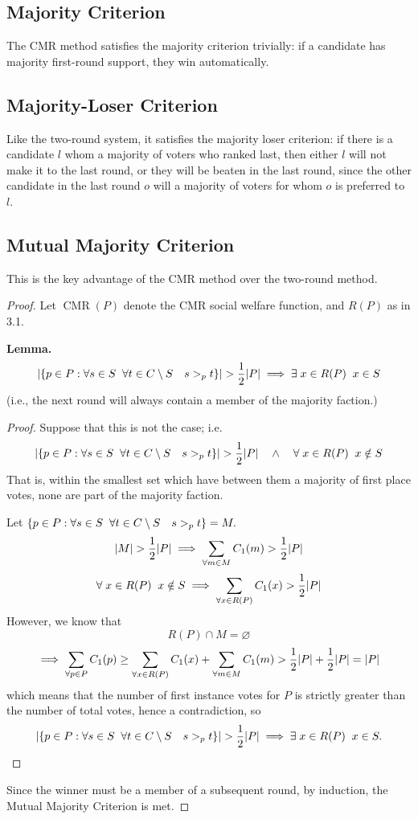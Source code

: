 \documentclass{article}
\DeclareMathOperator{\cmr}{CMR}
\begin{document}
\subsection{Majority Criterion}
The CMR method satisfies the majority criterion trivially: if a candidate has majority first-round support, they win automatically.
\subsection{Majority-Loser Criterion}
Like the two-round system, it satisfies the majority loser criterion: if there is a candidate $l$ whom a majority of voters who ranked last, then either $l$ will not make it to the last round, or they will be beaten in the last round, since the other candidate in the last round $o$ will a majority of voters for whom $o$ is preferred to $l$.
\subsection{Mutual Majority Criterion}
This is the key advantage of the CMR method over the two-round method. 

\begin{proof}
Let $\cmr(P)$ denote the CMR social welfare function, and $R(P)$ as in 3.1.

\textbf{Lemma.}
\[\abs{\qty{p \in P : \forall s \in S \;\; \forall t \in C\setminus S \quad s >_p t}} > \frac{1}{2}\abs{P} \implies \exists\; x \in R(P) \;\; x\in S\]
(i.e., the next round will always contain a member of the majority faction.)
\begin{proof}
Suppose that this is not the case; i.e.
\[\abs{\qty{p \in P : \forall s \in S \;\; \forall t \in C\setminus S \quad s >_p t}} > \frac{1}{2}\abs{P} \quad \land \quad \forall\; x \in R(P) \;\; x\notin S\]
That is, within the smallest set which have between them a majority of first place votes, none are part of the majority faction.

Let $\qty{p \in P : \forall s \in S \;\; \forall t \in C\setminus S \quad s >_p t} = M.$
\[\abs{M} > \frac{1}{2}\abs{P} \implies \sum_{\forall m \in M} C_1(m) > \frac{1}{2}\abs{P}\] %
\[\forall\; x \in R(P) \;\; x\notin S \implies \sum_{\forall x\in R(P)} C_1(x) > \frac{1}{2}\abs{P}\] 
However, we know that
\[ R(P) \cap M = \varnothing \]\[
\implies \sum_{\forall p\in P} C_1(p) \geq \sum_{\forall x\in R(P)} C_1(x) + \sum_{\forall m \in M} C_1(m) > \frac{1}{2}\abs{P} + \frac{1}{2}\abs{P} = \abs{P} \]
which means that the number of first instance votes for $P$ is strictly greater than the number of total votes, hence a contradiction, so 
\[\abs{\qty{p \in P : \forall s \in S \;\; \forall t \in C\setminus S \quad s >_p t}} > \frac{1}{2}\abs{P} \implies \exists\; x \in R(P) \;\; x\in S.\]
\end{proof}
Since the winner must be a member of a subsequent round, by induction, the Mutual Majority Criterion is met. %
\end{proof}
\end{document}
